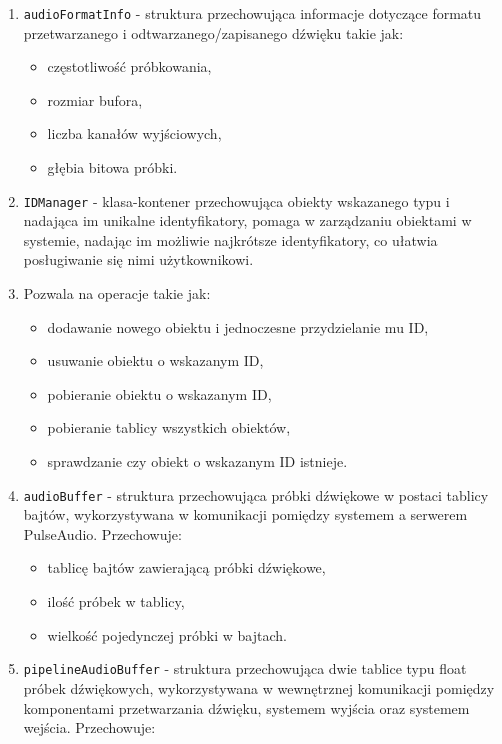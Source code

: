 \begin{enumerate}
    \item \texttt{audioFormatInfo} - struktura przechowująca informacje dotyczące formatu przetwarzanego i odtwarzanego/zapisanego dźwięku takie jak:
    \begin{itemize}
        \item częstotliwość próbkowania,
        \item rozmiar bufora,
        \item liczba kanałów wyjściowych,
        \item głębia bitowa próbki.
    \end{itemize}
    \item \texttt{IDManager} - klasa-kontener przechowująca obiekty wskazanego typu i nadająca im unikalne identyfikatory, pomaga w zarządzaniu obiektami w systemie, nadając im możliwie najkrótsze identyfikatory, co ułatwia posługiwanie się nimi użytkownikowi.
    \item Pozwala na operacje takie jak:
    \begin{itemize}
        \item dodawanie nowego obiektu i jednoczesne przydzielanie mu ID,
        \item usuwanie obiektu o wskazanym ID,
        \item pobieranie obiektu o wskazanym ID,
        \item pobieranie tablicy wszystkich obiektów,
        \item sprawdzanie czy obiekt o wskazanym ID istnieje.
    \end{itemize}
    \item \texttt{audioBuffer} - struktura przechowująca próbki dźwiękowe w postaci tablicy bajtów, wykorzystywana w komunikacji pomiędzy systemem a serwerem PulseAudio\cite{bib:PulseAudio}. Przechowuje:
    \begin{itemize}
        \item tablicę bajtów zawierającą próbki dźwiękowe,
        \item ilość próbek w tablicy,
        \item wielkość pojedynczej próbki w bajtach.
    \end{itemize}
    \item \texttt{pipelineAudioBuffer} - struktura przechowująca dwie tablice typu float próbek dźwiękowych, wykorzystywana w wewnętrznej komunikacji pomiędzy komponentami przetwarzania dźwięku, systemem wyjścia oraz systemem wejścia. Przechowuje:
    \begin{itemize}

\end{itemize}
\end{enumerate}
